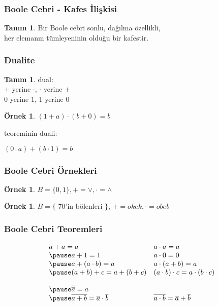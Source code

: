 \documentclass[dvipsnames]{beamer}
\theoremstyle{definition}
\newtheorem{tanim}[theorem]{Tanım}
\theoremstyle{example}
\newtheorem{ornek}[theorem]{Örnek}
\theoremstyle{plain}
\begin{document}
\begin{frame}
  \frametitle{Boole Cebri - Kafes İlişkisi}

  \begin{tanim}
    Bir Boole cebri sonlu, dağılma özellikli,\\
    her elemanın tümleyeninin olduğu bir kafestir.
  \end{tanim}
\end{frame}

\begin{frame}
  \frametitle{Dualite}

  \begin{tanim}
    \alert{dual}:\\
    $+$ yerine $\cdot$, $\cdot$ yerine $+$\\
    0 yerine 1, 1 yerine 0
  \end{tanim}

  \pause
  \begin{ornek}
    $(1 + a) \cdot (b + 0) = b$

    teoreminin duali:

    $(0 \cdot a) + (b \cdot 1) = b$
  \end{ornek}
\end{frame}

\begin{frame}
  \frametitle{Boole Cebri Örnekleri}

  \begin{ornek}
    $B = \{0,1\}, + = \vee, \cdot = \wedge$
  \end{ornek}

  \pause
  \begin{ornek}
    $B = \{$ $70$'in bölenleri $\}$, $+ = okek, \cdot = obeb$
  \end{ornek}
\end{frame}

\begin{frame}
  \frametitle{Boole Cebri Teoremleri}

    \[\begin{array}{ll}
      a + a = a &
      a \cdot a = a\\ \pause
      a + 1 = 1 &
      a \cdot 0 = 0\\ \pause
      a + (a \cdot b) = a &
      a \cdot (a + b) = a\\ \pause
      (a + b) + c = a + (b + c) &
      (a \cdot b) \cdot c = a \cdot (b \cdot c)\bigskip\\ \pause
      \overline{\overline{a}} = a & \\ \pause
      \overline{a + b} = \overline{a} \cdot \overline{b} &
      \overline{a \cdot b} = \overline{a} + \overline{b}
    \end{array}\]
\end{frame}
\end{document}
